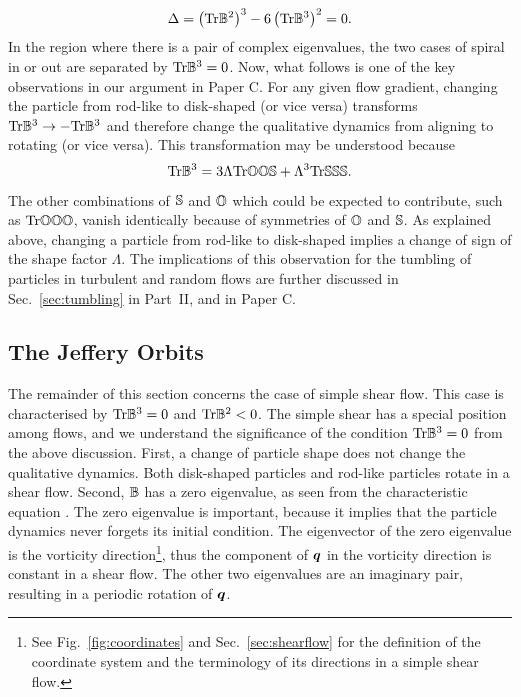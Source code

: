 \documentclass[thesis.tex]{subfiles}
\begin{document}
\begin{align*}
 	\Delta = \left(\mbox{Tr} \mathbb{B}^2\right)^3 - 6\left(\mbox{Tr} \mathbb{B}^3\right)^2 = 0.
 \end{align*} 
In the region where there is a pair of complex eigenvalues, the two cases of spiral in or out are separated by $\mbox{Tr} \mathbb{B}^3=0$. Now, what follows is one of the key observations in our argument in Paper C. For any given flow gradient, changing the particle from rod-like to disk-shaped (or vice versa) transforms $\mbox{Tr} \mathbb{B}^3\to-\mbox{Tr}\mathbb{B}^3$ and therefore change the qualitative dynamics from aligning to rotating (or vice versa). This transformation may be understood because
\begin{align*}
	\mbox{Tr} \mathbb{B}^3 = 3\Lambda \mbox{Tr} \mathbb{O}\mathbb{O} \mathbb{S} + \Lambda^3 \mbox{Tr} \mathbb{S}\mathbb{S} \mathbb{S}.
\end{align*}
The other combinations of $\mathbb{S}$ and $\mathbb{O}$ which could be expected to contribute, such as $\mbox{Tr} \mathbb{O}\mathbb{O} \mathbb{O}$, vanish identically because of symmetries of $\mathbb{O}$ and $\mathbb{S}$. As explained above, changing a particle from rod-like to disk-shaped implies a change of sign of the shape factor $\Lambda$. The implications of this observation for the tumbling of particles in turbulent and random flows are further discussed in Sec.~\ref{sec:tumbling} in Part~II, and in Paper C. 

\subsection{The Jeffery Orbits}

The remainder of this section concerns the case of simple shear flow. This case is characterised by $\mbox{Tr} \mathbb{B}^3=0$ and $\mbox{Tr} \mathbb{B}^2<0$. The simple shear has a special position among flows, and we understand the significance of the condition $\mbox{Tr}\mathbb{B}^3=0$ from the above discussion. First, a change of particle shape does not change the qualitative dynamics. Both disk-shaped particles and rod-like particles rotate in a shear flow. Second, $\mathbb{B}$ has a zero eigenvalue, as seen from the characteristic equation . The zero eigenvalue is important, because it implies that the particle dynamics never forgets its initial condition. The eigenvector of the zero eigenvalue is the vorticity direction\footnote{See Fig.~\ref{fig:coordinates} and Sec.~\ref{sec:shearflow} for the definition of the coordinate system and the terminology of its directions in a simple shear flow.}, thus the component of $\mbox{\boldmath$q$}$ in the vorticity direction is constant in a shear flow. The other two eigenvalues are an imaginary pair, resulting in a periodic rotation of $\mbox{\boldmath$q$}$.
\end{document}
